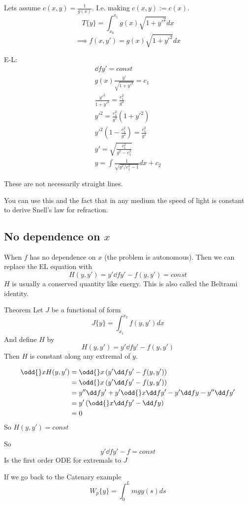 \documentclass{E:/Documents/Latex/myassignment}
\begin{document}
Lets assume $c(x,y) = \frac{1}{g(x)}$. I.e. making $c(x,y) := c(x)$.
\[T\{y\} = \int_{x_0}^{x_1} g(x)\sqrt{1+y'^2} dx\]
\[\implies f(x,y') = g(x) \sqrt{1+y'^2} dx\]

E-L:
\begin{align*}
	\dd f{y'} = const\\
	g(x) \frac{y'}{\sqrt{1+y'^2}} = c_1\\
	\frac{y'^2}{1+y'^2} = \frac{c_1^2}{g^2}\\
	y'^2 = \frac{c_1^2}{g^2} (1+y'^2)\\
	y'^2\left(1- \frac{c_1^2}{g^2}\right) = \frac{c_1^2}{g^2}\\
	y' = \sqrt{\frac{c_1^2}{g^2 - c_1^2}}\\
	y = \int \frac{1}{\sqrt{g^2/c_1^2 - 1}} dx+ c_2  
\end{align*}

These are not necessarily straight lines.

You can use this and the fact that in any medium the speed of light is constant to derive Snell's law for refraction.

\subsection{No dependence on $x$}
When $f$ has no dependence on $x$ (the problem is autonomous). Then we can replace the EL equation with
\[H(y,y') = y' \dd f{y'} - f(y,y') = const\]
$H$ is usually a conserved quantity like energy. This is also called the Beltrami identity.

Theorem Let $J$ be a functional of form
\[J\{y\} = \int_{x_1}^{x_2} f(y,y') dx\]
And define $H$ by
\[H(y,y') = y' \dd f{y'} - f(y,y')\]
Then $H$ is constant along any extremal of $y$.

\begin{align*}
	\odd{}x H(y,y') &= \odd{}x \left(y' \dd f{y'} - f(y,y')\right)\\
	&= \odd{}x \left(y' \dd f{y'} - f(y,y')\right)\\
	&= y'' \dd fy' + y' \odd{}x \dd fy' - y' \dd fy - y'' \dd f{y'}\\
	&= y'\left(\odd{}x \dd f{y'} - \dd fy\right)\\
	&= 0 
\end{align*}
So $H(y,y') = const$

So
\[y' \dd f{y'} -f = const\]
Is the first order ODE for extremals to $J$


If we go back to the Catenary example
\[W_p \{y\} = \int_0^L mg y(s) ds\]
\end{document}
